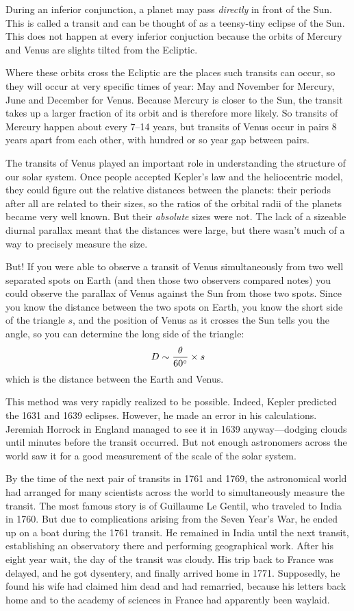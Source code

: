 \documentclass[12pt, preprint]{aastex}
\begin{document}
During an inferior conjunction, a planet may pass {\it directly} in
front of the Sun. This is called a transit and can be thought of as a
teensy-tiny eclipse of the Sun. This does not happen at every inferior
conjuction because the orbits of Mercury and Venus are slights tilted
from the Ecliptic.

Where these orbits cross the Ecliptic are the places such transits can
occur, so they will occur at very specific times of year: May and
November for Mercury, June and December for Venus. Because Mercury is
closer to the Sun, the transit takes up a larger fraction of its orbit
and is therefore more likely. So transits of Mercury happen about
every 7--14 years, but transits of Venus occur in pairs 8 years apart
from each other, with hundred or so year gap between pairs.

The transits of Venus played an important role in understanding the
structure of our solar system. Once people accepted Kepler's law and
the heliocentric model, they could figure out the relative distances
between the planets: their periods after all are related to their
sizes, so the ratios of the orbital radii of the planets became very
well known. But their {\it absolute} sizes were not. The lack of a
sizeable diurnal parallax meant that the distances were large, but
there wasn't much of a way to precisely measure the size.

But! If you were able to observe a transit of Venus simultaneously
from two well separated spots on Earth (and then those two observers
compared notes) you could observe the parallax of Venus against the
Sun from those two spots. Since you know the distance between the two
spots on Earth, you know the short side of the triangle $s$, and the
position of Venus as it crosses the Sun tells you the angle, so you
can determine the long side of the triangle:
\begin{equation}
D \sim \frac{\theta}{60{}^\circ} \times s
\end{equation}
which is the distance between the Earth and Venus.

This method was very rapidly realized to be possible. Indeed, Kepler
predicted the 1631 and 1639 eclipses. However, he made an error in his
calculations.  Jeremiah Horrock in England managed to see it in 1639
anyway---dodging clouds until minutes before the transit occurred.
But not enough astronomers across the world saw it for a good
measurement of the scale of the solar system.

By the time of the next pair of transits in 1761 and 1769, the
astronomical world had arranged for many scientists across the world
to simultaneously measure the transit.  The most famous story is of
Guillaume Le Gentil, who traveled to India in 1760. But due to
complications arising from the Seven Year's War, he ended up on a boat
during the 1761 transit. He remained in India until the next transit,
establishing an observatory there and performing geographical
work. After his eight year wait, the day of the transit was
cloudy. His trip back to France was delayed, and he got dysentery, and
finally arrived home in 1771. Supposedly, he found his wife had
claimed him dead and had remarried, because his letters back home and
to the academy of sciences in France had apparently been waylaid.
\end{document}
